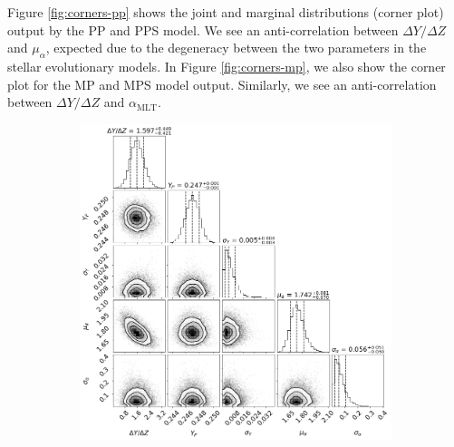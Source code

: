 \documentclass[fleqn,usenatbib]{mnras}
\newcommand{\mlt}{\ensuremath{{\alpha_\mathrm{MLT}}}}
\begin{document}
Figure \ref{fig:corners-pp} shows the joint and marginal distributions (corner plot) output by the PP and PPS model. We see an anti-correlation between $\Delta Y / \Delta Z$ and $\mu_\alpha$, expected due to the degeneracy between the two parameters in the stellar evolutionary models. In Figure \ref{fig:corners-mp}, we also show the corner plot for the MP and MPS model output. Similarly, we see an anti-correlation between $\Delta Y / \Delta Z$ and $\mlt$.

\begin{figure}
    \begin{subfigure}[b]{.5\linewidth}
        \centering
        \includegraphics[width=\textwidth]{figures/corner_plot_pp.png}
    \end{subfigure}%
    \begin{subfigure}[b]{.5\linewidth}
        \centering

\end{subfigure}
\end{figure}
\end{document}
